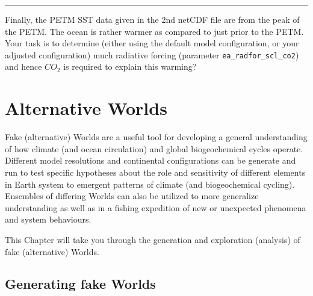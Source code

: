 \documentclass[11pt,fleqn]{book} %
\begin{document}
\vspace{1mm}
\noindent\rule{4cm}{0.1mm}
\vspace{2mm}

\noindent Finally, the PETM SST data given in the 2nd netCDF file are from the peak of the PETM. The ocean is rather warmer as compared to just prior to the PETM. Your task is to determine (either using the default model configuration, or your adjusted configuration) much radiative forcing (parameter \texttt{ea\_radfor\_scl\_co2}) and hence \(CO_{2}\) is required to explain this warming?


\cleardoublepage


\chapter{Alternative Worlds}\label{ch:alternative-worlds}

\hfill \break

\noindent Fake (alternative) Worlds are a useful tool for developing a general understanding of how climate (and ocean circulation) and global biogeochemical cycles operate. Different model resolutions and continental configurations can be generate and run to test specific hypotheses about the role and sensitivity of different elements in Earth system to emergent patterns of climate (and biogeochemical cycling). Ensembles of differing Worlds can also be utilized to more generalize understanding as well as in a fishing expedition of new or unexpected phenomena and system behaviours.

This Chapter will take you through the generation and exploration (analysis) of fake (alternative) Worlds.


\newpage

%
\section{Generating fake Worlds}

\end{document}
